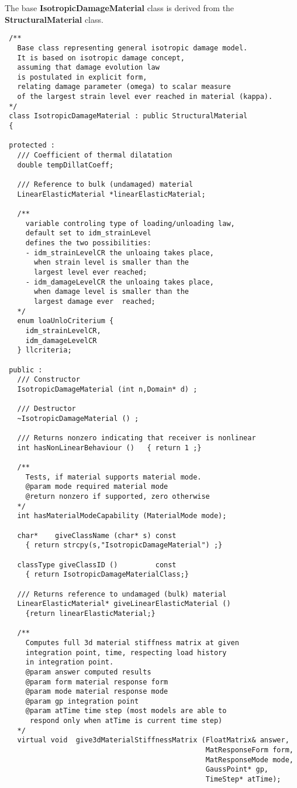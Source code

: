 \documentclass[12pt,draft]{article}
\newcommand{\class}[1]{{\bf #1}}
\begin{document}
 The base \class{IsotropicDamageMaterial} class is derived
 from the \class{StructuralMaterial} class. 

 {\small
 \begin{verbatim}
 /**
   Base class representing general isotropic damage model.
   It is based on isotropic damage concept, 
   assuming that damage evolution law
   is postulated in explicit form, 
   relating damage parameter (omega) to scalar measure 
   of the largest strain level ever reached in material (kappa).
 */
 class IsotropicDamageMaterial : public StructuralMaterial
 {

 protected :
   /// Coefficient of thermal dilatation
   double tempDillatCoeff;

   /// Reference to bulk (undamaged) material
   LinearElasticMaterial *linearElasticMaterial;  

   /**
     variable controling type of loading/unloading law, 
     default set to idm_strainLevel
     defines the two possibilities:
     - idm_strainLevelCR the unloaing takes place, 
       when strain level is smaller than the 
       largest level ever reached;
     - idm_damageLevelCR the unloaing takes place, 
       when damage level is smaller than the 
       largest damage ever  reached;
   */
   enum loaUnloCriterium {
     idm_strainLevelCR, 
     idm_damageLevelCR 
   } llcriteria;

 public :
   /// Constructor
   IsotropicDamageMaterial (int n,Domain* d) ;

   /// Destructor
   ~IsotropicDamageMaterial () ;

   /// Returns nonzero indicating that receiver is nonlinear
   int hasNonLinearBehaviour ()   { return 1 ;}

   /**
     Tests, if material supports material mode.
     @param mode required material mode
     @return nonzero if supported, zero otherwise
   */
   int hasMaterialModeCapability (MaterialMode mode);

   char*    giveClassName (char* s) const 
     { return strcpy(s,"IsotropicDamageMaterial") ;}

   classType giveClassID ()         const 
     { return IsotropicDamageMaterialClass;}

   /// Returns reference to undamaged (bulk) material
   LinearElasticMaterial* giveLinearElasticMaterial () 
     {return linearElasticMaterial;}

   /**
     Computes full 3d material stiffness matrix at given 
     integration point, time, respecting load history 
     in integration point.
     @param answer computed results
     @param form material response form
     @param mode material response mode
     @param gp integration point
     @param atTime time step (most models are able to 
      respond only when atTime is current time step)
   */
   virtual void  give3dMaterialStiffnessMatrix (FloatMatrix& answer,
                                                MatResponseForm form, 
                                                MatResponseMode mode, 
                                                GaussPoint* gp,
                                                TimeStep* atTime);


\end{verbatim}}
\end{document}
